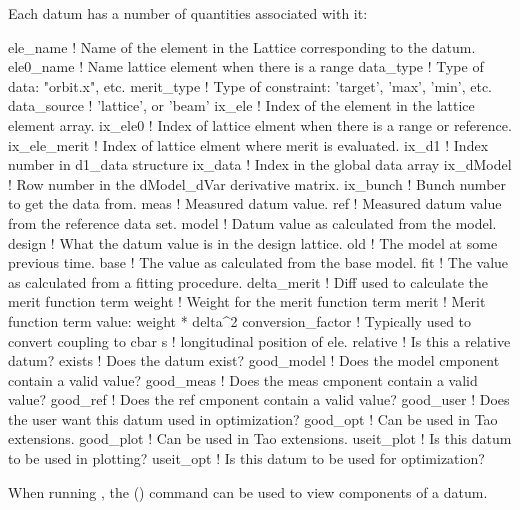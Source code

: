 Each datum has a number of quantities associated with it:
\begin{example}
  ele_name       ! Name of the element in the Lattice corresponding to the datum.
  ele0_name      ! Name lattice element when there is a range 
  data_type      ! Type of data: "orbit.x", etc.
  merit_type     ! Type of constraint: 'target', 'max', 'min', etc.
  data_source    ! 'lattice', or 'beam'
  ix_ele            ! Index of the element in the lattice element array.
  ix_ele0           ! Index of lattice elment when there is a range or reference.
  ix_ele_merit      ! Index of lattice elment where merit is evaluated.
  ix_d1             ! Index number in d1_data structure
  ix_data           ! Index in the global data array
  ix_dModel         ! Row number in the dModel_dVar derivative matrix.
  ix_bunch          ! Bunch number to get the data from.
  meas              ! Measured datum value. 
  ref               ! Measured datum value from the reference data set.
  model             ! Datum value as calculated from the model.
  design            ! What the datum value is in the design lattice.
  old               ! The model at some previous time.
  base              ! The value as calculated from the base model.
  fit               ! The value as calculated from a fitting procedure.
  delta_merit       ! Diff used to calculate the merit function term 
  weight            ! Weight for the merit function term
  merit             ! Merit function term value: weight * delta^2
  conversion_factor ! Typically used to convert coupling to cbar
  s                 ! longitudinal position of ele.
  relative          ! Is this a relative datum?
  exists            ! Does the datum exist?
  good_model        ! Does the model cmponent contain a valid value?
  good_meas         ! Does the meas cmponent contain a valid value?
  good_ref          ! Does the ref cmponent contain a valid value?
  good_user         ! Does the user want this datum used in optimization?
  good_opt          ! Can be used in Tao extensions.
  good_plot         ! Can be used in Tao extensions.
  useit_plot        ! Is this datum to be used in plotting?
  useit_opt         ! Is this datum to be used for optimization?
\end{example}
When running \tao, the 
() command can be used to view components of a datum.

